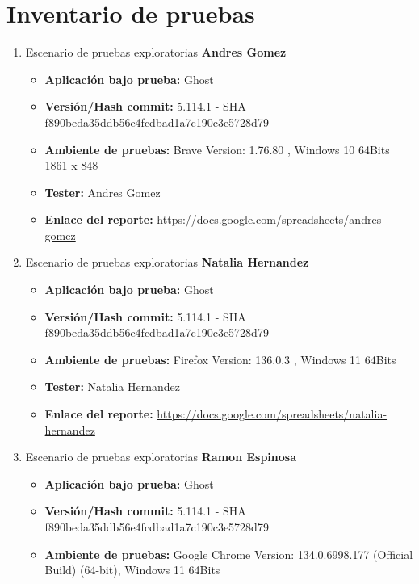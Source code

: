 \documentclass[report,12pt]{article}
\begin{document}
\section{Inventario de pruebas}
\begin{enumerate}
    \item Escenario de pruebas exploratorias \textbf{Andres Gomez}
    \begin{itemize}
        \item \textbf{Aplicación bajo prueba:} Ghost
        \item \textbf{Versión/Hash commit:} 5.114.1 - SHA f890beda35ddb56e4fcdbad1a7c190c3e5728d79
        \item \textbf{Ambiente de pruebas:} Brave Version: 1.76.80 , Windows 10 64Bits 1861 x 848
        \item \textbf{Tester:} Andres Gomez
        \item \textbf{Enlace del reporte:} \href{https://docs.google.com/spreadsheets/d/1AW5Uuod1t0fUaCuIDGt3VsMxNsfL1ElC/edit?gid=2070240166#gid=2070240166}{https://docs.google.com/spreadsheets/andres-gomez}
    \end{itemize}
    \item Escenario de pruebas exploratorias \textbf{Natalia Hernandez}
    \begin{itemize}
        \item \textbf{Aplicación bajo prueba:} Ghost
        \item \textbf{Versión/Hash commit:} 5.114.1 - SHA f890beda35ddb56e4fcdbad1a7c190c3e5728d79
        \item \textbf{Ambiente de pruebas:} Firefox Version: 136.0.3 , Windows 11 64Bits
        \item \textbf{Tester:} Natalia Hernandez
        \item \textbf{Enlace del reporte:} \href{https://docs.google.com/spreadsheets/d/1AW5Uuod1t0fUaCuIDGt3VsMxNsfL1ElC/edit?gid=978517391#gid=978517391}{https://docs.google.com/spreadsheets/natalia-hernandez}
    \end{itemize}
    \item Escenario de pruebas exploratorias \textbf{Ramon Espinosa}
    \begin{itemize}
        \item \textbf{Aplicación bajo prueba:} Ghost
        \item \textbf{Versión/Hash commit:} 5.114.1 - SHA f890beda35ddb56e4fcdbad1a7c190c3e5728d79
        \item \textbf{Ambiente de pruebas:} Google Chrome Version: 134.0.6998.177 (Official Build) (64-bit), Windows 11 64Bits

\end{itemize}
\end{enumerate}
\end{document}
